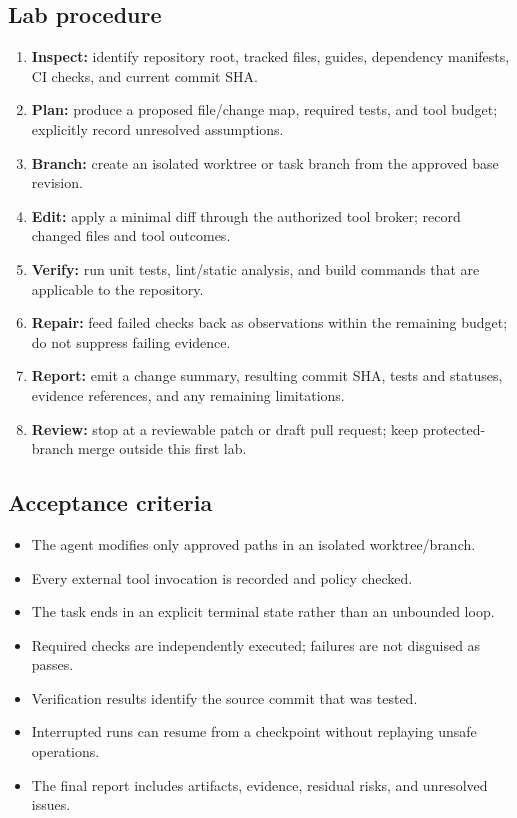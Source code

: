 \documentclass[10pt,letterpaper]{article}
\begin{document}
\subsection{Lab procedure}
\begin{enumerate}
  \item \textbf{Inspect:} identify repository root, tracked files, guides, dependency manifests, CI checks, and current commit SHA.
  \item \textbf{Plan:} produce a proposed file/change map, required tests, and tool budget; explicitly record unresolved assumptions.
  \item \textbf{Branch:} create an isolated worktree or task branch from the approved base revision.
  \item \textbf{Edit:} apply a minimal diff through the authorized tool broker; record changed files and tool outcomes.
  \item \textbf{Verify:} run unit tests, lint/static analysis, and build commands that are applicable to the repository.
  \item \textbf{Repair:} feed failed checks back as observations within the remaining budget; do not suppress failing evidence.
  \item \textbf{Report:} emit a change summary, resulting commit SHA, tests and statuses, evidence references, and any remaining limitations.
  \item \textbf{Review:} stop at a reviewable patch or draft pull request; keep protected-branch merge outside this first lab.
\end{enumerate}

\subsection{Acceptance criteria}
\begin{tcolorbox}[colback=PaperGray,colframe=CoolGray,breakable,arc=1.5mm,title={\color{DeepBlue}\bfseries Definition of done}]
\begin{itemize}[label=$\square$]
  \item The agent modifies only approved paths in an isolated worktree/branch.
  \item Every external tool invocation is recorded and policy checked.
  \item The task ends in an explicit terminal state rather than an unbounded loop.
  \item Required checks are independently executed; failures are not disguised as passes.
  \item Verification results identify the source commit that was tested.
  \item Interrupted runs can resume from a checkpoint without replaying unsafe operations.
  \item The final report includes artifacts, evidence, residual risks, and unresolved issues.
\end{itemize}
\end{tcolorbox}
\end{document}
